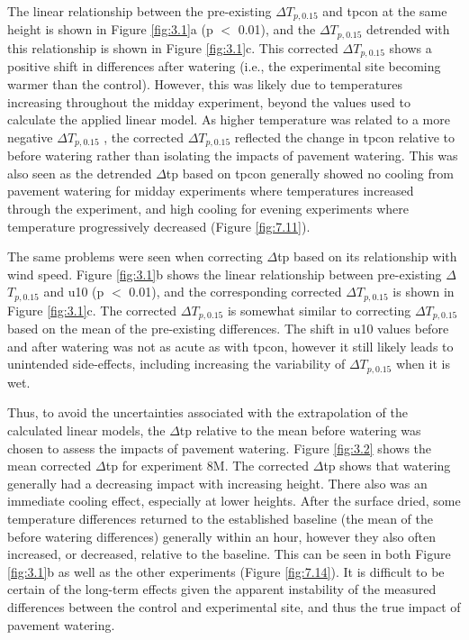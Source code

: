 \documentclass[final,3p,times,authoryear]{elsarticle}
\begin{document}
The linear relationship between the pre-existing $\Delta$$T_{p,0.15}$ and \gls{tpcon} at the same height is shown in Figure \ref{fig:3.1}a (p $<$ 0.01), and the $\Delta$$T_{p,0.15}$ detrended with this relationship is shown in Figure \ref{fig:3.1}c. This corrected $\Delta$$T_{p,0.15}$ shows a positive shift in differences after watering (i.e., the experimental site becoming warmer than the control). However, this was likely due to temperatures increasing throughout the midday experiment, beyond the values used to calculate the applied linear model. As higher temperature was related to a more negative $\Delta$$T_{p,0.15}$ , the corrected $\Delta$$T_{p,0.15}$ reflected the change in \gls{tpcon} relative to before watering rather than isolating the impacts of pavement watering. This was also seen as the detrended $\Delta$\gls{tp} based on \gls{tpcon} generally showed no cooling from pavement watering for midday experiments where temperatures increased through the experiment, and high cooling for evening experiments where temperature progressively decreased (Figure \ref{fig:7.11}).

The same problems were seen when correcting $\Delta$\gls{tp} based on its relationship with wind speed. Figure \ref{fig:3.1}b shows the linear relationship between pre-existing $\Delta$$T_{p,0.15}$ and \gls{u10} (\gls{p} $<$ 0.01), and the corresponding corrected $\Delta$$T_{p,0.15}$ is shown in Figure \ref{fig:3.1}c. The corrected $\Delta$$T_{p,0.15}$ is somewhat similar to correcting $\Delta$$T_{p,0.15}$ based on the mean of the pre-existing differences. The shift in \gls{u10} values before and after watering was not as acute as with \gls{tpcon}, however it still likely leads to unintended side-effects, including increasing the variability of $\Delta$$T_{p,0.15}$ when it is wet.

Thus, to avoid the uncertainties associated with the extrapolation of the calculated linear models, the $\Delta$\gls{tp} relative to the mean before watering was chosen to assess the impacts of pavement watering. Figure \ref{fig:3.2} shows the mean corrected $\Delta$\gls{tp} for experiment 8M. The corrected $\Delta$\gls{tp} shows that watering generally had a decreasing impact with increasing height. There also was an immediate cooling effect, especially at lower heights. After the surface dried, some temperature differences returned to the established baseline (the mean of the before watering differences) generally within an hour, however they also often increased, or decreased, relative to the baseline. This can be seen in both Figure \ref{fig:3.1}b as well as the other experiments (Figure \ref{fig:7.14}). It is difficult to be certain of the long-term effects given the apparent instability of the measured differences between the control and experimental site, and thus the true impact of pavement watering.
\end{document}
